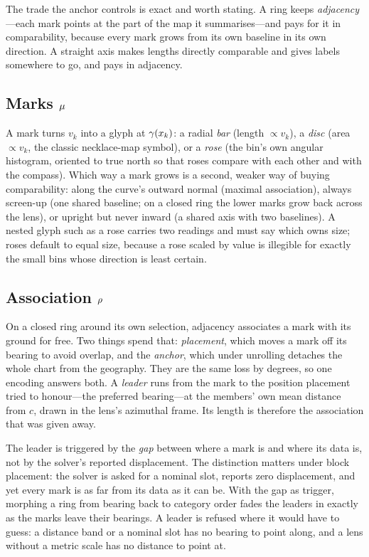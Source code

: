 The trade the anchor controls is exact and worth stating. A ring keeps
\emph{adjacency}---each mark points at the part of the map it summarises---and
pays for it in comparability, because every mark grows from its own baseline in
its own direction. A straight axis makes lengths directly comparable and gives
labels somewhere to go, and pays in adjacency.

\subsection{Marks $\mu$}

A mark turns $v_k$ into a glyph at $\gamma(x_k)$: a radial \emph{bar} (length
$\propto v_k$), a \emph{disc} (area $\propto v_k$, the classic necklace-map
symbol), or a \emph{rose} (the bin's own angular histogram, oriented to true
north so that roses compare with each other and with the compass). Which way a
mark grows is a second, weaker way of buying comparability: along the curve's
outward normal (maximal association), always screen-up (one shared baseline;
on a closed ring the lower marks grow back across the lens), or upright but
never inward (a shared axis with two baselines). A nested glyph such as a rose
carries two readings and must say which owns size; roses default to equal
size, because a rose scaled by value is illegible for exactly the small bins
whose direction is least certain.

\subsection{Association $\rho$}
\label{sec:association}

On a closed ring around its own selection, adjacency associates a mark with its
ground for free. Two things spend that: \emph{placement}, which moves a mark
off its bearing to avoid overlap, and the \emph{anchor}, which under unrolling
detaches the whole chart from the geography. They are the same loss by
degrees, so one encoding answers both. A \emph{leader} runs from the mark to
the position placement tried to honour---the preferred bearing---at the
members' own mean distance from $c$, drawn in the lens's azimuthal frame. Its
length is therefore the association that was given away.

The leader is triggered by the \emph{gap} between where a mark is and where its
data is, not by the solver's reported displacement. The distinction matters
under block placement: the solver is asked for a nominal slot, reports zero
displacement, and yet every mark is as far from its data as it can be. With
the gap as trigger, morphing a ring from bearing back to category order fades
the leaders in exactly as the marks leave their bearings. A leader is refused
where it would have to guess: a distance band or a nominal slot has no bearing
to point along, and a lens without a metric scale has no distance to point at.

